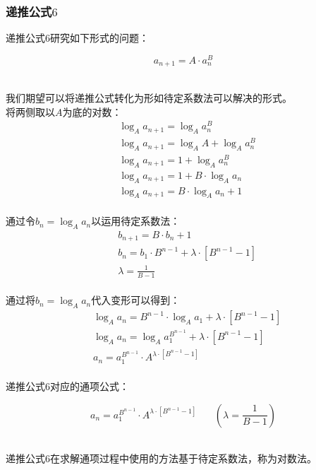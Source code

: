 \documentclass[UTF8]{ctexart}
\begin{document}
\newpage

\subsubsection{递推公式$6$}
    \setcounter{equation}{0}
    递推公式$6$研究如下形式的问题：
    \begin{large}
        \begin{equation*}
            a_{n+1}=A\cdot a_n^B
        \end{equation*}
    \end{large}\\
    我们期望可以将递推公式转化为形如待定系数法可以解决的形式。\\[3mm]
    将两侧取以$A$为底的对数：
    \begin{align}
        &\log_{A}a_{n+1}=\log_{A}a_n^B\\[4mm]
        &\log_{A}a_{n+1}=\log_{A}A+\log_{A}a_n^B\\[4mm]
        &\log_{A}a_{n+1}=1+\log_{A}a_n^B\\[4mm]
        &\log_{A}a_{n+1}=1+B\cdot\log_{A}a_n\\[4mm]
        &\log_{A}a_{n+1}=B\cdot\log_{A}a_n+1
    \end{align}\\
    通过令$b_n=\log_{A}a_n$以运用待定系数法：
    \begin{align}
        &b_{n+1}=B\cdot b_n+1\\[3mm]
        &b_n=b_1\cdot B^{n-1}+\lambda\cdot\left[B^{n-1}-1\right]\\[4mm]
        &\lambda=\frac{1}{B-1}
    \end{align}\\
    通过将$b_n=\log_{A}a_n$代入变形可以得到：
    \begin{align}
        &\log_{A}a_n=B^{n-1}\cdot\log_{A}a_1+\lambda\cdot\left[B^{n-1}-1\right]\\[3mm]
        &\log_{A}a_n=\log_{A}a_1^{B^{n-1}}+\lambda\cdot\left[B^{n-1}-1\right]\\[3mm]
        &a_n=a_1^{B^{n-1}}\cdot A^{\lambda\cdot[B^{n-1}-1]}
    \end{align}\\
    递推公式$6$对应的通项公式：
    \begin{large}
        \begin{equation*}
            a_n=a_1^{B^{n-1}}\cdot A^{\lambda\cdot[B^{n-1}-1]}~~~~~~~~\left(\lambda=\frac{1}{B-1}\right)
        \end{equation*}
    \end{large}\\
    递推公式$6$在求解通项过程中使用的方法基于待定系数法，称为对数法。
\end{document}
